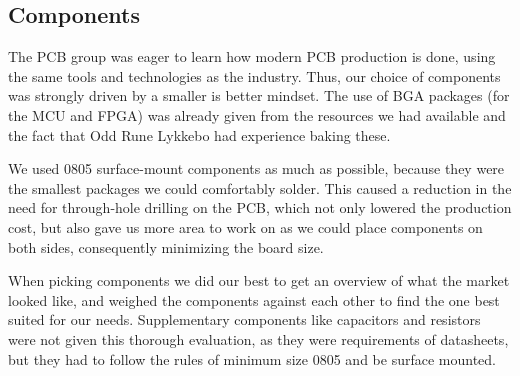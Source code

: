 
\subsection{Components}

The PCB group was eager to learn how modern PCB production is done, using the
same tools and technologies as the industry. Thus, our choice of components was
strongly driven by a smaller is better mindset. The use of BGA packages (for the
MCU and FPGA) was already given from the resources we had available and the fact
that Odd Rune Lykkebo had experience baking these.

We used 0805 surface-mount components as much as possible, because they were the
smallest packages we could comfortably solder. This caused a reduction in the
need for through-hole drilling on the PCB, which not only lowered the production
cost, but also gave us more area to work on as we could place components on both
sides, consequently minimizing the board size.

When picking components we did our best to get an overview of what the market
looked like, and weighed the components against each other to find the one best
suited for our needs. Supplementary components like capacitors and resistors
were not given this thorough evaluation, as they were requirements of
datasheets, but they had to follow the rules of minimum size 0805 and be surface
mounted.






